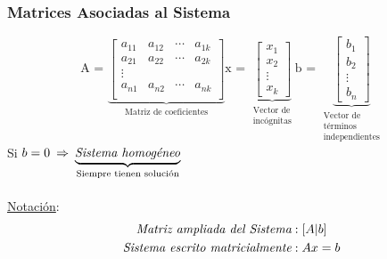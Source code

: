 \documentclass{article}
\newcommand{\Rightarrows}{\: \Rightarrow \:}            %
\begin{document}
\subsubsection*{Matrices Asociadas al Sistema}
\begin{equation*}
    \text{A = }
    \underbrace{\begin{bmatrix}
        a_{11} & a_{12} & \cdots & a_{1k} \\
        a_{21} & a_{22} & \cdots & a_{2k} \\
        \vdots & \\
        a_{n1} & a_{n2} & \cdots & a_{nk} \\
    \end{bmatrix}}_{\text{Matriz de coeficientes}}
    \text{x = }
    \underbrace{\begin{bmatrix}
        x_1 \\ x_2 \\ \vdots \\ x_k
    \end{bmatrix}}_{\substack{\text{Vector de}\\\text{incógnitas}}}
    \text{b = }
    \underbrace{\begin{bmatrix}
        b_1 \\ b_2 \\ \vdots \\b_n
    \end{bmatrix}}_{\substack{\text{Vector de}\\\text{términos}\\\text{independientes}}}
\end{equation*}
Si $b = 0 \Rightarrows \underbrace{\text{\emph{Sistema homogéneo}}}_{\text{Siempre tienen solución}}$
\\\\\underline{Notación}: \begin{align}
                            \emph{Matriz ampliada del Sistema} &: [A | b] \\
                            \emph{Sistema escrito matricialmente} &: Ax =b
                        \end{align}
                        
\end{document}
